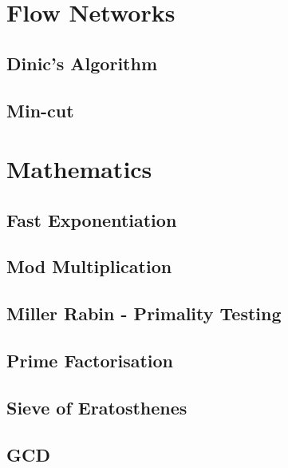 \documentclass[11pt, letterpaper]{article}
\begin{document}
\section{Flow Networks}

\subsection{Dinic's Algorithm}


\subsection{Min-cut}


\section{Mathematics}

\subsection{Fast Exponentiation}


\subsection{Mod Multiplication}


\subsection{Miller Rabin - Primality Testing}


\subsection{Prime Factorisation}


\subsection{Sieve of Eratosthenes}


\subsection{GCD}

\end{document}
